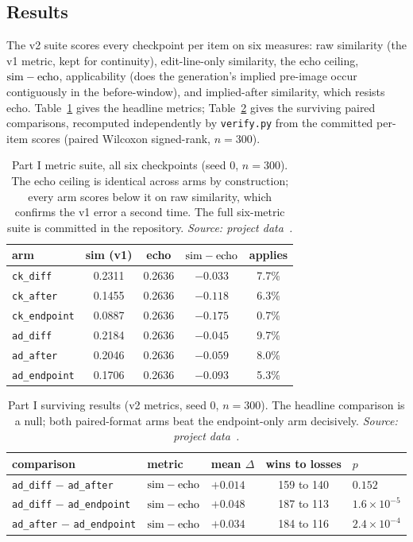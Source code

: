 \subsection{Results}

The v2 suite scores every checkpoint per item on six measures: raw similarity (the v1 metric, kept for continuity), edit-line-only similarity, the echo ceiling, $\mathrm{sim}-\mathrm{echo}$, applicability (does the generation's implied pre-image occur contiguously in the before-window), and implied-after similarity, which resists echo. Table~\ref{tab:part1full} gives the headline metrics; Table~\ref{tab:part1} gives the surviving paired comparisons, recomputed independently by \texttt{verify.py} from the committed per-item scores (paired Wilcoxon signed-rank, $n = 300$).

\begin{table}[htbp]
\centering\footnotesize
\caption{Part I metric suite, all six checkpoints (seed 0, $n = 300$). The echo ceiling is identical across arms by construction; every arm scores below it on raw similarity, which confirms the v1 error a second time. The full six-metric suite is committed in the repository. \emph{Source: project data~\cite{appliedrepo2026}.}}
\label{tab:part1full}
\begin{tabular}{lcccc}
\toprule
arm & sim (v1) & echo & $\mathrm{sim}-\mathrm{echo}$ & applies \\
\midrule
\texttt{ck\_diff} & 0.2311 & 0.2636 & $-0.033$ & 7.7\% \\
\texttt{ck\_after} & 0.1455 & 0.2636 & $-0.118$ & 6.3\% \\
\texttt{ck\_endpoint} & 0.0887 & 0.2636 & $-0.175$ & 0.7\% \\
\texttt{ad\_diff} & 0.2184 & 0.2636 & $-0.045$ & 9.7\% \\
\texttt{ad\_after} & 0.2046 & 0.2636 & $-0.059$ & 8.0\% \\
\texttt{ad\_endpoint} & 0.1706 & 0.2636 & $-0.093$ & 5.3\% \\
\bottomrule
\end{tabular}
\end{table}

\begin{table}[htbp]
\centering\small
\caption{Part I surviving results (v2 metrics, seed 0, $n=300$). The headline comparison is a null; both paired-format arms beat the endpoint-only arm decisively. \emph{Source: project data~\cite{appliedrepo2026}.}}
\label{tab:part1}
\begin{tabular}{lllcl}
\toprule
comparison & metric & mean $\Delta$ & wins to losses & $p$ \\
\midrule
\texttt{ad\_diff} $-$ \texttt{ad\_after} & $\mathrm{sim}-\mathrm{echo}$ & $+0.014$ & 159 to 140 & $0.152$ \\
\texttt{ad\_diff} $-$ \texttt{ad\_endpoint} & $\mathrm{sim}-\mathrm{echo}$ & $+0.048$ & 187 to 113 & $1.6\times10^{-5}$ \\
\texttt{ad\_after} $-$ \texttt{ad\_endpoint} & $\mathrm{sim}-\mathrm{echo}$ & $+0.034$ & 184 to 116 & $2.4\times10^{-4}$ \\
\bottomrule
\end{tabular}
\end{table}

